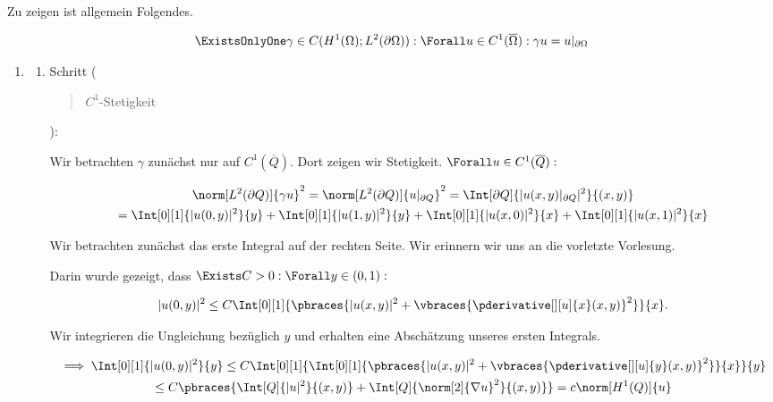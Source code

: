 \begin{solution}

Zu zeigen ist allgemein Folgendes.

\begin{align*}
  \ExistsOnlyOne \gamma \in C
  (
    H^1(\Omega);
    L^2(\partial \Omega)
  ):
  \Forall u \in C^1(\overline{\Omega}):
  \gamma u = u|_{\partial \Omega}
\end{align*}

\begin{enumerate}[label = \textbf{\alph*)}]

  \item

  \begin{enumerate}[label = \arabic*.]

    \item Schritt (\blockquote{$C^1$-Stetigkeit}):

    Wir betrachten $\gamma$ zunächst nur auf $C^1(\overline{Q})$.
    Dort zeigen wir Stetigkeit.
    $\Forall u \in C^1(\overline{Q}):$

    \begin{multline*}
      \norm[L^2(\partial Q)]{\gamma u}^2
      =
      \norm[L^2(\partial Q)]{u|_{\partial Q}}^2
      =
      \Int[\partial Q]{|u(x, y)|_{\partial Q}|^2}{(x, y)} \\
      =
      \Int[0][1]{|u(0, y)|^2}{y}
      +
      \Int[0][1]{|u(1, y)|^2}{y}
      +
      \Int[0][1]{|u(x, 0)|^2}{x}
      +
      \Int[0][1]{|u(x, 1)|^2}{x}
    \end{multline*}

    Wir betrachten zunächst das erste Integral auf der rechten Seite.
    Wir erinnern wir uns an die vorletzte Vorlesung.


    Darin wurde gezeigt, dass $\Exists C > 0: \Forall y \in (0, 1):$

    \begin{align*}
      |u(0, y)|^2
      \leq
      C\Int[0][1]
      {
        \pbraces
        {
          |u(x, y)|^2
          +
          \vbraces
          {
            \pderivative[][u]{x}(x, y)
          }^2
        }
      }{x}.
    \end{align*}

    Wir integrieren die Ungleichung bezüglich $y$ und erhalten eine Abschätzung unseres ersten Integrals.

    \begin{multline*}
      \implies
      \Int[0][1]{|u(0, y)|^2}{y}
      \leq
      C
      \Int[0][1]
      {
        \Int[0][1]
        {
          \pbraces
          {
            |u(x, y)|^2
            +
            \vbraces
            {
              \pderivative[][u]{y}(x, y)
            }^2
          }
        }{x}
      }{y} \\
      \leq
      C
      \pbraces
      {
        \Int[Q]{|u|^2}{(x, y)}
        +
        \Int[Q]{\norm[2]{\nabla u}^2}{(x, y)}
      }
      =
      c \norm[H^1(Q)]{u}
    \end{multline*}


\end{enumerate}
\end{enumerate}
\end{solution}
